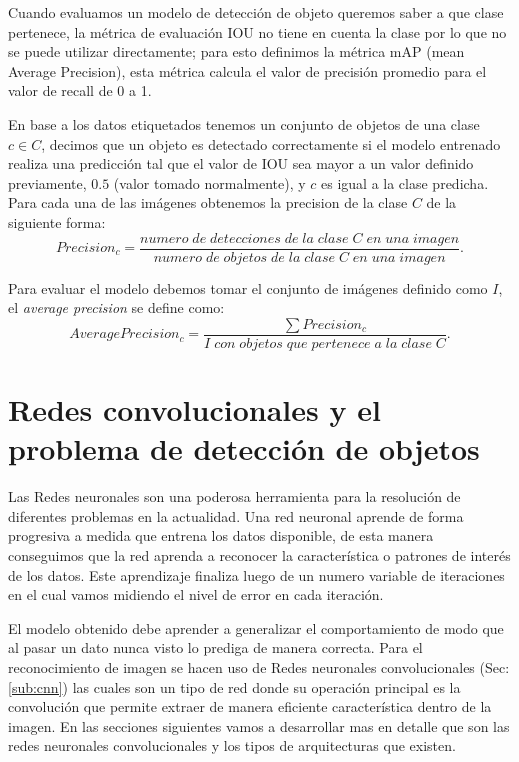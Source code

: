 Cuando evaluamos un modelo de detección de objeto queremos saber a que clase pertenece, la métrica de evaluación IOU no tiene en cuenta la clase por lo que no se puede utilizar directamente; para esto definimos la métrica mAP (mean Average Precision), esta métrica calcula el valor de precisión promedio para el valor de recall de 0 a 1.

En base a los datos etiquetados tenemos un conjunto de objetos de una clase $c \in C$, decimos que un objeto es detectado correctamente si el modelo entrenado realiza una predicción tal que el valor de IOU sea mayor a un valor definido previamente, $0.5$ (valor tomado normalmente), y $c$ es igual a la clase predicha. Para cada una de las imágenes obtenemos la precision de la clase $C$ de la siguiente forma:
\begin{equation}
Precision_c = \frac{numero\;de\;detecciones\;de\;la\;clase\;C\;en\;una\;imagen}{numero\;de\;objetos\;de\;la\;clase\;C\;en\;una\;imagen}.
\end{equation}

Para evaluar el modelo debemos tomar el conjunto de imágenes definido como $I$, el \textit{average precision} se define como:
\begin{equation}
Average Precision_c = \frac{\sum Precision_c}{I\;con\;objetos\;que\;pertenece\;a\;la\;clase\;C}.
\end{equation}



\section{Redes convolucionales y el problema de detección de objetos}\label{sec:compueter-vision}

Las Redes neuronales son una poderosa herramienta para la resolución de diferentes problemas en la actualidad. Una red neuronal aprende de forma progresiva a medida que entrena los datos disponible, de esta manera conseguimos que la red aprenda a reconocer la característica o patrones de interés de los datos. Este aprendizaje finaliza luego de un numero variable de iteraciones en el cual vamos midiendo el nivel de error en cada iteración.

El modelo obtenido debe aprender a generalizar el comportamiento de modo que al pasar un dato nunca visto lo prediga de manera correcta. Para el reconocimiento de imagen se hacen uso de Redes neuronales convolucionales (Sec:\ref{sub:cnn}) las cuales son un tipo de red donde su operación principal es la convolución que permite extraer de manera eficiente característica dentro de la imagen. En las secciones siguientes vamos a desarrollar mas en detalle que son las redes neuronales convolucionales y los tipos de arquitecturas que existen. 


